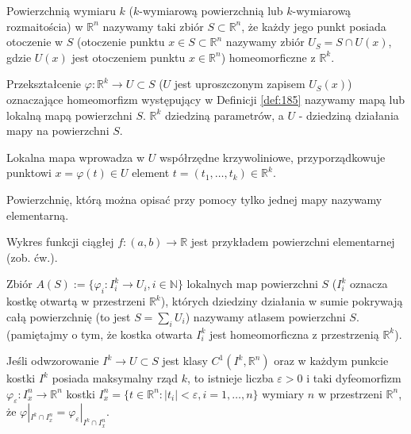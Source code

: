 \documentclass[leqno]{article}
\begin{document}
\begin{justify}
\begin{defn}
    Powierzchnią wymiaru $k$ ($k$-wymiarową powierzchnią lub $k$-wymiarową rozmaitościa) w $\mathbb{R}^n$ nazywamy taki zbiór $S \subset \mathbb{R}^n$,
    że każdy jego punkt posiada otoczenie w $S$ (otoczenie punktu $x \in S \subset \mathbb{R}^n$ nazywamy zbiór $U_S = S \cap U(x)$, gdzie 
    $U(x)$ jest otoczeniem punktu $x \in \mathbb{R}^n$) homeomorficzne z $\mathbb{R}^k$. 
\end{defn}

\begin{defn}
    Przekształcenie $\varphi : \mathbb{R}^k \to U \subset S$ ($U$ jest uproszczonym zapisem $U_S(x)$) 
    oznaczające homeomorfizm występujący w Definicji \ref{def:185} nazywamy mapą lub lokalną mapą powierzchni $S$. $\mathbb{R}^k$ dziedziną parametrów, a $U$
    - dziedziną działania mapy na powierzchni $S$. 
\end{defn}

Lokalna mapa wprowadza w $U$ współrzędne krzywoliniowe, przyporządkowuje punktowi $x = \varphi(t) \in U$ element $t = (t_1, \ldots, t_k) \in \mathbb{R}^k$.

\begin{defn}
    Powierzchnię, którą można opisać przy pomocy tylko jednej mapy nazywamy elementarną.
\end{defn}

Wykres funkcji ciągłej $f : (a,b) \to \mathbb{R}$ jest przykładem powierzchni elementarnej (zob. ćw.).

\begin{defn}
    Zbiór $A(S) := \{\varphi_i : I_{i}^k \to U_i, i \in \mathbb{N}\}$ lokalnych map powierzchni $S$ ($I_i^k$ oznacza kostkę otwartą w przestrzeni $\mathbb{R}^k$),
    których dziedziny działania w sumie pokrywają całą powierzchnię (to jest $S = \sum_i U_i$) nazywamy atlasem powierzchni $S$.
    (pamiętajmy o tym, że kostka otwarta $I_i^k$ jest homeomorficzna z przestrzenią $\mathbb{R}^k$).
\end{defn}

\begin{theorem}
{
    Jeśli odwzorowanie $I^k \to U \subset S$ jest klasy $C^1(I^k, \mathbb{R}^n)$ oraz w każdym punkcie kostki $I^k$ posiada maksymalny rząd $k$, to istnieje liczba 
    $\varepsilon > 0$ i taki dyfeomorfizm $\varphi_\varepsilon : I_x^n \to \mathbb{R}^n$ kostki $I_x^n = \{t \in \mathbb{R}^n : |t_i| < \varepsilon, i = 1, \ldots, n \}$ wymiary $n$ 
    w przestrzeni $\mathbb{R}^n$, że $\varphi|_{I^k \cap I^n_x} = \varphi_{\varepsilon}|_{I^k \cap I_x^n}$.
}
\end{theorem}


\end{justify}
\end{document}
